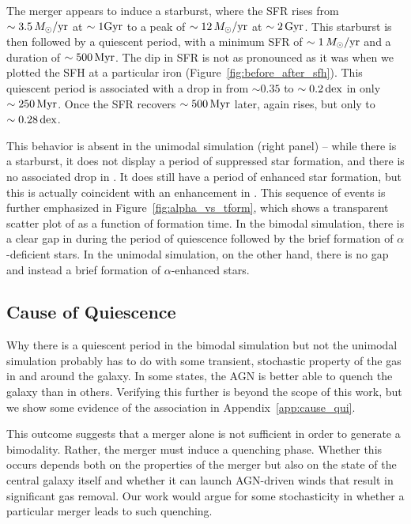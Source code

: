 The merger appears to induce a starburst, where the SFR rises from $\sim3.5\,M_{\odot}/\textrm{yr}$ at $\sim1\textrm{Gyr}$ to a peak of $\sim12\,M_{\odot}/\textrm{yr}$ at $\sim2\,\textrm{Gyr}$. This starburst is then followed by a quiescent period, with a minimum SFR of $\sim1\,M_{\odot}/\textrm{yr}$ and a duration of $\sim500\,\textrm{Myr}$. The dip in SFR is not as pronounced as it was when we plotted the SFH at a particular iron (Figure~\ref{fig:before_after_sfh}). This quiescent period is associated with a drop in \MgFe{} from $\sim0.35$ to $\sim0.2\,\textrm{dex}$ in only $\sim250\,\textrm{Myr}$. Once the SFR recovers $\sim500\,\textrm{Myr}$ later, \MgFe{} again rises, but only to $\sim0.28\,\textrm{dex}$.

This behavior is absent in the unimodal simulation (right panel) -- while there is a starburst, it does not display a period of suppressed star formation, and there is no associated drop in \MgFe{}. It does still have a period of enhanced star formation, but this is actually coincident with an enhancement in \MgFe{}. This sequence of events is further emphasized in Figure~\ref{fig:alpha_vs_tform}, which shows a transparent scatter plot of \MgFe{} as a function of formation time. In the bimodal simulation, there is a clear gap in \MgFe{} during the period of quiescence followed by the brief formation of $\alpha$-deficient stars. In the unimodal simulation, on the other hand, there is no gap and instead a brief formation of $\alpha$-enhanced stars.

\subsection{Cause of Quiescence}\label{ssec:cause_qui}
Why there is a quiescent period in the bimodal simulation but not the unimodal simulation probably has to do with some transient, stochastic property of the gas in and around the galaxy. In some states, the AGN is better able to quench the galaxy than in others. Verifying this further is beyond the scope of this work, but we show some evidence of the association in Appendix~\ref{app:cause_qui}.

This outcome suggests that a merger alone is not sufficient in order to generate a bimodality. Rather, the merger must induce a quenching phase. Whether this occurs depends both on the properties of the merger but also on the state of the central galaxy itself and whether it can launch AGN-driven winds that result in significant gas removal. Our work would argue for some stochasticity in whether a particular merger leads to such quenching.

